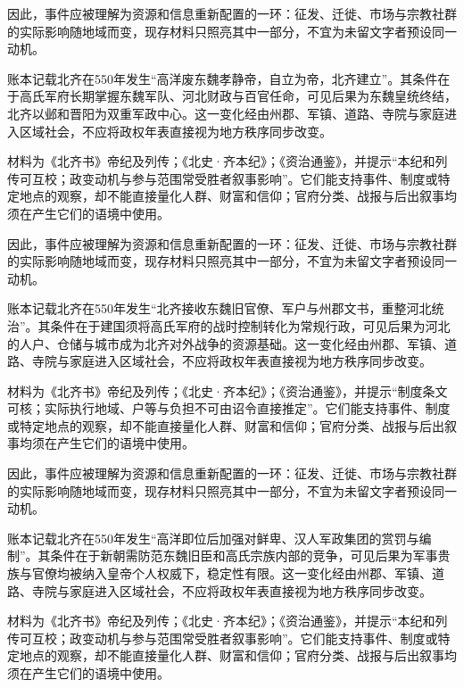 因此，事件应被理解为资源和信息重新配置的一环：征发、迁徙、市场与宗教社群的实际影响随地域而变，现存材料只照亮其中一部分，不宜为未留文字者预设同一动机。

账本记载北齐在550年发生“高洋废东魏孝静帝，自立为帝，北齐建立”。其条件在于高氏军府长期掌握东魏军队、河北财政与百官任命，可见后果为东魏皇统终结，北齐以邺和晋阳为双重军政中心。这一变化经由州郡、军镇、道路、寺院与家庭进入区域社会，不应将政权年表直接视为地方秩序同步改变。

材料为《北齐书》帝纪及列传；《北史·齐本纪》；《资治通鉴》，并提示“本纪和列传可互校；政变动机与参与范围常受胜者叙事影响”。它们能支持事件、制度或特定地点的观察，却不能直接量化人群、财富和信仰；官府分类、战报与后出叙事均须在产生它们的语境中使用。

因此，事件应被理解为资源和信息重新配置的一环：征发、迁徙、市场与宗教社群的实际影响随地域而变，现存材料只照亮其中一部分，不宜为未留文字者预设同一动机。

账本记载北齐在550年发生“北齐接收东魏旧官僚、军户与州郡文书，重整河北统治”。其条件在于建国须将高氏军府的战时控制转化为常规行政，可见后果为河北的人户、仓储与城市成为北齐对外战争的资源基础。这一变化经由州郡、军镇、道路、寺院与家庭进入区域社会，不应将政权年表直接视为地方秩序同步改变。

材料为《北齐书》帝纪及列传；《北史·齐本纪》；《资治通鉴》，并提示“制度条文可核；实际执行地域、户等与负担不可由诏令直接推定”。它们能支持事件、制度或特定地点的观察，却不能直接量化人群、财富和信仰；官府分类、战报与后出叙事均须在产生它们的语境中使用。

因此，事件应被理解为资源和信息重新配置的一环：征发、迁徙、市场与宗教社群的实际影响随地域而变，现存材料只照亮其中一部分，不宜为未留文字者预设同一动机。

账本记载北齐在550年发生“高洋即位后加强对鲜卑、汉人军政集团的赏罚与编制”。其条件在于新朝需防范东魏旧臣和高氏宗族内部的竞争，可见后果为军事贵族与官僚均被纳入皇帝个人权威下，稳定性有限。这一变化经由州郡、军镇、道路、寺院与家庭进入区域社会，不应将政权年表直接视为地方秩序同步改变。

材料为《北齐书》帝纪及列传；《北史·齐本纪》；《资治通鉴》，并提示“本纪和列传可互校；政变动机与参与范围常受胜者叙事影响”。它们能支持事件、制度或特定地点的观察，却不能直接量化人群、财富和信仰；官府分类、战报与后出叙事均须在产生它们的语境中使用。

